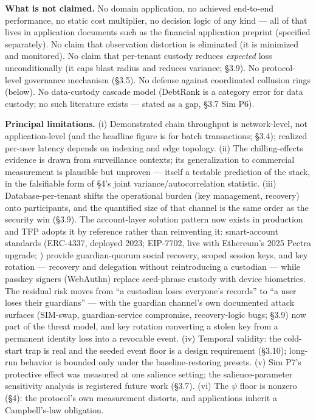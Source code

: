 \documentclass[11pt,twocolumn]{article}
\begin{document}
\textbf{What is not claimed.} No domain application, no achieved
end-to-end performance, no static cost multiplier, no decision logic of
any kind --- all of that lives in application documents such as the financial application preprint (specified separately). No claim that observation distortion is eliminated
(it is minimized and monitored). No claim that per-tenant custody
reduces \emph{expected} loss unconditionally (it caps blast radius and
reduces variance; §3.9). No protocol-level governance mechanism (§3.5).
No defense against coordinated collusion rings (below). No data-custody
cascade model (DebtRank is a category error for data custody; no such
literature exists --- stated as a gap, §3.7 Sim P6).

\textbf{Principal limitations.} (i) Demonstrated chain throughput is
network-level, not application-level (and the headline figure is for
batch transactions; §3.4); realized per-user latency depends on indexing
and edge topology. (ii) The chilling-effects evidence is drawn from
surveillance contexts; its generalization to commercial measurement is
plausible but unproven --- itself a testable prediction of the stack, in
the falsifiable form of §4's joint variance/autocorrelation statistic.
(iii) Database-per-tenant shifts the operational burden (key management,
recovery) onto participants, and the quantified size of that channel is
the same order as the security win (§3.9). The account-layer solution
pattern now exists in production and TFP adopts it by reference rather
than reinventing it: smart-account standards (ERC-4337, deployed 2023;
EIP-7702, live with Ethereum's 2025 Pectra upgrade;
\citealp{buterin2021}) provide guardian-quorum social recovery, scoped
session keys, and key rotation --- recovery and delegation without
reintroducing a custodian --- while passkey signers (WebAuthn) replace
seed-phrase custody with device biometrics. The residual risk moves from
``a custodian loses everyone's records'' to ``a user loses their
guardians'' --- with the guardian channel's own documented attack
surfaces (SIM-swap, guardian-service compromise, recovery-logic bugs;
§3.9) now part of the threat model, and key rotation converting a stolen
key from a permanent identity loss into a revocable event. (iv) Temporal
validity: the cold-start trap is real and the seeded event floor is a
design requirement (§3.10); long-run behavior is bounded only under the
baseline-restoring presets. (v) Sim P7's protective effect was measured
at one salience setting; the salience-parameter sensitivity analysis is
registered future work (§3.7). (vi) The \(\psi\) floor is nonzero (§4):
the protocol's own measurement distorts, and applications inherit a
Campbell's-law obligation.
\end{document}
